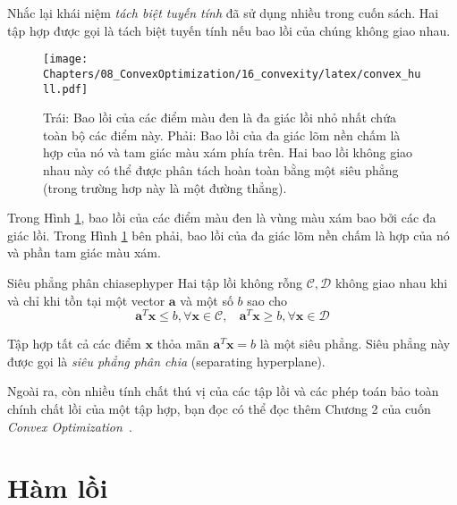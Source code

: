 Nhắc lại khái niệm \textit{tách biệt tuyến tính} đã sử dụng nhiều trong cuốn
sách. Hai tập hợp được gọi là tách biệt tuyến tính nếu bao lồi của chúng không giao nhau.

\begin{figure}[t]
\centering
    \texttt{[image: Chapters/08\_ConvexOptimization/16\_convexity/latex/convex\_hull.pdf]}
    \caption[]{Trái: Bao lồi của các điểm màu đen là đa giác lồi nhỏ nhất chứa toàn bộ các điểm này. Phải: Bao lồi của đa giác lõm nền chấm là hợp của nó và tam giác màu xám phía trên. Hai bao lồi không giao nhau này có thể được phân tách hoàn toàn bằng một siêu phẳng (trong trường hơp này là một đường thẳng).}
    \label{fig:16_convex_hull}
    \captionsetup[figure]{format=rule, justification=centering}
\end{figure}


Trong Hình \ref{fig:16_convex_hull}, bao lồi của các điểm màu đen là vùng
màu xám bao bởi các đa giác lồi. Trong Hình \ref{fig:16_convex_hull} bên phải,
bao lồi của đa giác lõm nền chấm là hợp của nó và phần tam giác màu xám. 

\begin{mytheo}{Siêu phẳng phân chia}{sephyper}
Hai {tập lồi không rỗng} $\mathcal{C}, \mathcal{D}$  {không giao
nhau} khi và chỉ khi tồn tại một vector $\mathbf{a}$ và một số $b$ sao cho
\begin{equation*} 
\mathbf{a}^T\mathbf{x} \leq b, \forall \mathbf{x} \in \mathcal{C}, ~~ \text{}~~ \mathbf{a}^T\mathbf{x} \geq b, \forall \mathbf{x} \in \mathcal{D} 
\end{equation*} 

Tập hợp tất cả các điểm $\mathbf{x}$ thỏa mãn $\mathbf{a}^T\mathbf{x} = b$ là một siêu phẳng. Siêu phẳng này được gọi là \textit{siêu phẳng phân chia} ({separating hyperplane}). 
\end{mytheo}

Ngoài ra, còn nhiều tính chất thú vị của các tập lồi và các phép toán bảo toàn
chính chất {lồi} của một tập hợp, bạn đọc có thể đọc thêm
Chương 2 của cuốn \textit{Convex Optimization}~\cite{boyd2004convex}.
 
 
\section{Hàm lồi}
 
 
